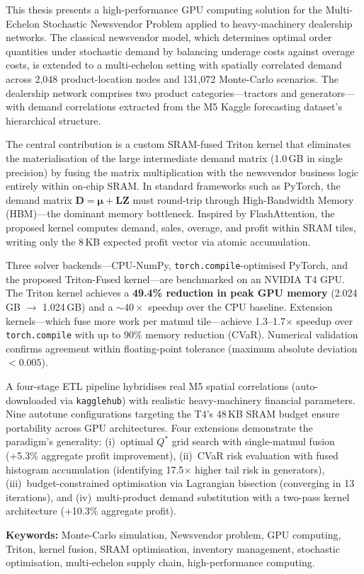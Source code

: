 This thesis presents a high-performance GPU computing solution for the Multi-Echelon Stochastic Newsvendor Problem applied to heavy-machinery dealership networks. The classical newsvendor model, which determines optimal order quantities under stochastic demand by balancing underage costs against overage costs, is extended to a multi-echelon setting with spatially correlated demand across 2,048 product-location nodes and 131,072 Monte-Carlo scenarios. The dealership network comprises two product categories---tractors and generators---with demand correlations extracted from the M5 Kaggle forecasting dataset's hierarchical structure.

The central contribution is a custom SRAM-fused Triton kernel that eliminates the materialisation of the large intermediate demand matrix (1.0\,GB in single precision) by fusing the matrix multiplication with the newsvendor business logic entirely within on-chip SRAM. In standard frameworks such as PyTorch, the demand matrix $\mathbf{D} = \bm{\mu} + \mathbf{L}\mathbf{Z}$ must round-trip through High-Bandwidth Memory (HBM)---the dominant memory bottleneck. Inspired by FlashAttention, the proposed kernel computes demand, sales, overage, and profit within SRAM tiles, writing only the 8\,KB expected profit vector via atomic accumulation.

Three solver backends---CPU-NumPy, \texttt{torch.compile}-optimised PyTorch, and the proposed Triton-Fused kernel---are benchmarked on an NVIDIA T4 GPU. The Triton kernel achieves a \textbf{49.4\% reduction in peak GPU memory} (2.024\,GB $\to$ 1.024\,GB) and a ${\sim}40\times$ speedup over the CPU baseline. Extension kernels---which fuse more work per matmul tile---achieve 1.3--1.7$\times$ speedup over \texttt{torch.compile} with up to 90\% memory reduction (CVaR). Numerical validation confirms agreement within floating-point tolerance (maximum absolute deviation $< 0.005$).

A four-stage ETL pipeline hybridises real M5 spatial correlations (auto-downloaded via \texttt{kagglehub}) with realistic heavy-machinery financial parameters. Nine autotune configurations targeting the T4's 48\,KB SRAM budget ensure portability across GPU architectures. Four extensions demonstrate the paradigm's generality: (i)~optimal $Q^*$ grid search with single-matmul fusion (+5.3\% aggregate profit improvement), (ii)~CVaR risk evaluation with fused histogram accumulation (identifying 17.5$\times$ higher tail risk in generators), (iii)~budget-constrained optimisation via Lagrangian bisection (converging in 13 iterations), and (iv)~multi-product demand substitution with a two-pass kernel architecture (+10.3\% aggregate profit).

\vspace{0.8em}
\noindent\textbf{Keywords:} Monte-Carlo simulation, Newsvendor problem, GPU computing, Triton, kernel fusion, SRAM optimisation, inventory management, stochastic optimisation, multi-echelon supply chain, high-performance computing.
